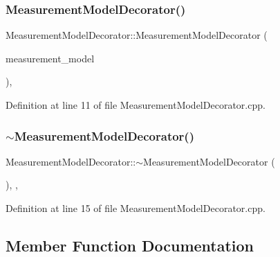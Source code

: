 \subsubsection{\texorpdfstring{Measurement\+Model\+Decorator()}{MeasurementModelDecorator()}\hspace{0.1cm}{\footnotesize\ttfamily [2/2]}}
{\footnotesize\ttfamily Measurement\+Model\+Decorator\+::\+Measurement\+Model\+Decorator (\begin{DoxyParamCaption}\item[{\mbox{\hyperlink{classbfl_1_1MeasurementModelDecorator}{Measurement\+Model\+Decorator}} \&\&}]{measurement\+\_\+model }\end{DoxyParamCaption})\hspace{0.3cm}{\ttfamily [protected]}, {\ttfamily [noexcept]}}



Definition at line 11 of file Measurement\+Model\+Decorator.\+cpp.

\mbox{\label{classbfl_1_1MeasurementModelDecorator_ac32603f06174b8eba271d5237d0ef566}} 
\subsubsection{\texorpdfstring{$\sim$\+Measurement\+Model\+Decorator()}{~MeasurementModelDecorator()}}
{\footnotesize\ttfamily Measurement\+Model\+Decorator\+::$\sim$\+Measurement\+Model\+Decorator (\begin{DoxyParamCaption}{ }\end{DoxyParamCaption})\hspace{0.3cm}{\ttfamily [protected]}, {\ttfamily [virtual]}, {\ttfamily [noexcept]}}



Definition at line 15 of file Measurement\+Model\+Decorator.\+cpp.



\subsection{Member Function Documentation}
\mbox{\label{classbfl_1_1Logger_a440467a28ccc46490d767fe0ef6f556a}} 
